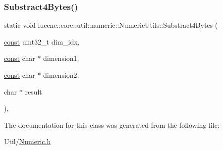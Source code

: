 \mbox{\label{classlucene_1_1core_1_1util_1_1numeric_1_1NumericUtils_adc8172d03864cf97fc6a266fdb425773}} 
\subsubsection{\texorpdfstring{Substract4\+Bytes()}{Substract4Bytes()}}
{\footnotesize\ttfamily static void lucene\+::core\+::util\+::numeric\+::\+Numeric\+Utils\+::\+Substract4\+Bytes (\begin{DoxyParamCaption}\item[{\mbox{\hyperlink{ZlibCrc32_8h_a2c212835823e3c54a8ab6d95c652660e}{const}} uint32\+\_\+t}]{dim\+\_\+idx,  }\item[{\mbox{\hyperlink{ZlibCrc32_8h_a2c212835823e3c54a8ab6d95c652660e}{const}} char $\ast$}]{dimension1,  }\item[{\mbox{\hyperlink{ZlibCrc32_8h_a2c212835823e3c54a8ab6d95c652660e}{const}} char $\ast$}]{dimension2,  }\item[{char $\ast$}]{result }\end{DoxyParamCaption})\hspace{0.3cm}{\ttfamily [inline]}, {\ttfamily [static]}}



The documentation for this class was generated from the following file\+:\begin{DoxyCompactItemize}
\item 
Util/\mbox{\hyperlink{Numeric_8h}{Numeric.\+h}}\end{DoxyCompactItemize}
